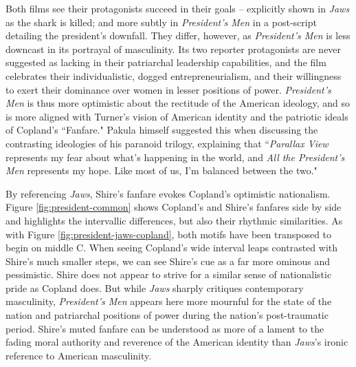 Both films see their protagonists succeed in their goals – explicitly shown in \textit{Jaws} as the shark is killed; and more subtly in \textit{President's Men} in a post-script detailing the president's downfall.
They differ, however, as \textit{President's Men} is less downcast in its portrayal of masculinity.
Its two reporter protagonists are never suggested as lacking in their patriarchal leadership capabilities, and the film celebrates their individualistic, dogged entrepreneurialism, and their willingness to exert their dominance over women in lesser positions of power.
\textit{President's Men} is thus more optimistic about the rectitude of the American ideology, and so is more aligned with Turner's vision of American identity and the patriotic ideals of Copland's ``Fanfare."
Pakula himself suggested this when discussing the contrasting ideologies of his paranoid trilogy, explaining that ``\textit{Parallax View} represents my fear about what's happening in the world, and \textit{All the President's Men} represents my hope. Like most of us, I'm balanced between the two."\autocites[Pakula, quoted in][]{aquilina_all_2021}


By referencing \textit{Jaws}, Shire's fanfare evokes Copland's optimistic nationalism.\autocites[Although Copland's influence on Shire's compositional practices has been less documented than Williams', Juan Chattah notes that he was exposed to Copland's work from a young age and this ``had a profound effect on Shire, and triggered his interest in contemporary concert music."][2]{chattah_david_2015}
Figure \ref{fig:president-common} shows Copland's and Shire's fanfares side by side and highlights the intervallic differences, but also their rhythmic similarities.
As with Figure \ref{fig:president-jaws-copland}, both motifs have been transposed to begin on middle C.
When seeing Copland's wide interval leaps contrasted with Shire's much smaller steps, we can see Shire's cue as a far more ominous and pessimistic.
Shire does not appear to strive for a similar sense of nationalistic pride as Copland does.
But while \textit{Jaws} sharply critiques contemporary masculinity, \textit{President's Men} appears here more mournful for the state of the nation and patriarchal positions of power during the nation's post-traumatic period.
Shire's muted fanfare can be understood as more of a lament to the fading moral authority and reverence of the American identity than \textit{Jaws}'s ironic reference to American masculinity.

